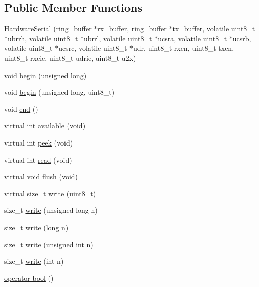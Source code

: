 \subsection*{Public Member Functions}
\begin{DoxyCompactItemize}
\item 
\hyperlink{class_hardware_serial_a3f8623cacdc470b5415c9aaca8bb443d}{Hardware\-Serial} (ring\-\_\-buffer $\ast$rx\-\_\-buffer, ring\-\_\-buffer $\ast$tx\-\_\-buffer, volatile uint8\-\_\-t $\ast$ubrrh, volatile uint8\-\_\-t $\ast$ubrrl, volatile uint8\-\_\-t $\ast$ucsra, volatile uint8\-\_\-t $\ast$ucsrb, volatile uint8\-\_\-t $\ast$ucsrc, volatile uint8\-\_\-t $\ast$udr, uint8\-\_\-t rxen, uint8\-\_\-t txen, uint8\-\_\-t rxcie, uint8\-\_\-t udrie, uint8\-\_\-t u2x)
\item 
void \hyperlink{class_hardware_serial_a8b36de01c04d1e7f94178b34caad3729}{begin} (unsigned long)
\item 
void \hyperlink{class_hardware_serial_aad4db7a746742b1023a6157419d9b63c}{begin} (unsigned long, uint8\-\_\-t)
\item 
void \hyperlink{class_hardware_serial_a0f86c41f580e04bdf30ea00e9014eacd}{end} ()
\item 
virtual int \hyperlink{class_hardware_serial_a60e2bb4a3f40cfaf94601cd4e3333f43}{available} (void)
\item 
virtual int \hyperlink{class_hardware_serial_a69b3cfa7d35cc8102fe14e302034f194}{peek} (void)
\item 
virtual int \hyperlink{class_hardware_serial_a760f254188b4687f5a8a74f4ddd3c83d}{read} (void)
\item 
virtual void \hyperlink{class_hardware_serial_a33a5d5c5ffa184e2c303a21152fa2abe}{flush} (void)
\item 
virtual size\-\_\-t \hyperlink{class_hardware_serial_ae241985e86ddd58b967aae7e88cdf417}{write} (uint8\-\_\-t)
\item 
size\-\_\-t \hyperlink{class_hardware_serial_a16f45867c871788b2440696531f79839}{write} (unsigned long n)
\item 
size\-\_\-t \hyperlink{class_hardware_serial_ade858bfb5ab807abc646fec974c00435}{write} (long n)
\item 
size\-\_\-t \hyperlink{class_hardware_serial_aefe3473ecb98923c9d7e9f9d18604727}{write} (unsigned int n)
\item 
size\-\_\-t \hyperlink{class_hardware_serial_a4d67d5698c572032d98ad445d3b4f897}{write} (int n)
\item 
\hyperlink{class_hardware_serial_a3038bc051efae1dac1ad3eb39f18f7ea}{operator bool} ()
\end{DoxyCompactItemize}
